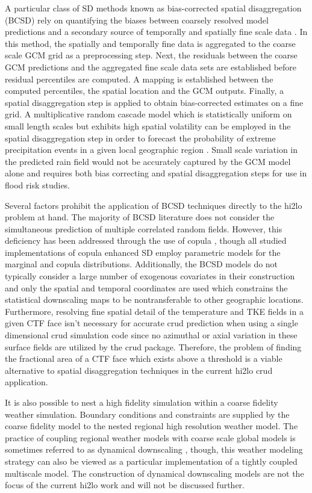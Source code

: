 A particular class of SD methods known as bias-corrected spatial disaggregation (BCSD) rely on quantifying the biases between coarsely resolved model predictions and a secondary source of temporally and spatially fine scale data \cite{wood2002}.  In this method, the spatially and temporally fine data is aggregated to the coarse scale GCM grid as a preprocessing step.  Next, the residuals between the coarse GCM predictions and the aggregated fine scale data sets are established before residual percentiles are computed.  A mapping is established between the computed percentiles, the spatial location and the GCM outputs.  Finally, a spatial disaggregation step is applied to obtain bias-corrected estimates on a fine grid.  A multiplicative random cascade model which is statistically uniform on small length scales but exhibits high spatial volatility can be employed in the spatial disaggregation step in order to forecast the probability of extreme precipitation events in a given local geographic region \cite{hess2007}.  Small scale variation in the predicted rain field would not be accurately captured by the GCM model alone and requires both bias correcting and spatial disaggregation steps for use in flood risk studies. 

Several factors prohibit the application of BCSD techniques directly to the hi2lo problem at hand.  The majority of BCSD literature does not consider the simultaneous prediction of multiple correlated random fields. However, this deficiency has been addressed through the use of copula \cite{alaya2014}, though all studied implementations of copula enhanced SD employ parametric models for the marginal and copula distributions.  Additionally, the BCSD models do not typically consider a large number of exogenous covariates in their construction and only the spatial and temporal coordinates are used which constrains the statistical downscaling maps to be nontransferable to other geographic locations.  Furthermore, resolving fine spatial detail of the temperature and TKE fields in a given CTF face isn't necessary for accurate crud prediction when using a single dimensional crud simulation code since no azimuthal or axial variation in these surface fields are utilized by the crud package.  Therefore, the problem of finding the fractional area of a CTF face which exists above a threshold is a viable alternative to spatial disaggregation techniques in the current hi2lo crud application.

It is also possible to nest a high fidelity simulation within a coarse fidelity weather simulation. Boundary conditions and constraints are supplied by the coarse fidelity model to the nested regional high resolution weather model.  The practice of coupling regional weather models with coarse scale global models is sometimes referred to as dynamical downscaling \cite{Caldwell2009}, though, this weather modeling strategy can also be viewed as a particular implementation of a tightly coupled multiscale model.  The construction of dynamical downscaling models are not the focus of the current hi2lo work and will not be discussed further.

